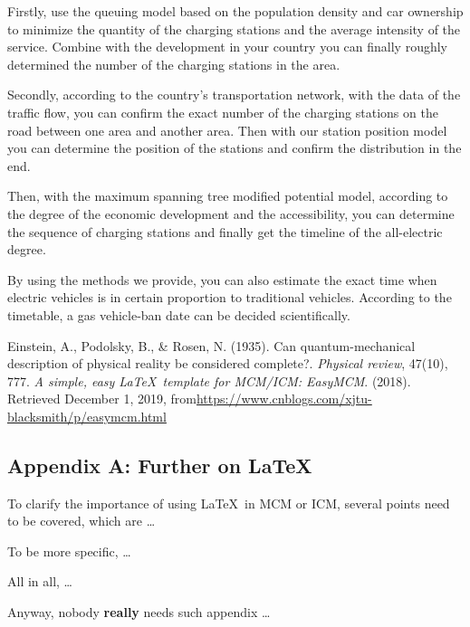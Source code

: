 \documentclass[12pt]{article}  %
\begin{document}
Firstly, use the queuing model based on the population density and car ownership to minimize the quantity of the charging stations and the average intensity of the service. Combine with the development in your country you can finally roughly determined the number of the charging stations in the area.

Secondly, according to the country’s transportation network, with the data of the traffic flow, you can confirm the exact number of the charging stations on the road between one area and another area. Then with our station position model you can determine the position of the stations and confirm the distribution in the end.

Then, with the maximum spanning tree modified potential model, according to the degree of the economic development and the accessibility, you can determine the sequence of charging stations and finally get the timeline of the all-electric degree.

By using the methods we provide, you can also estimate the exact time when electric vehicles is in certain proportion to traditional vehicles. According to the timetable, a gas vehicle-ban date can be decided scientifically.
\begin{thebibliography}{99}
 Einstein, A., Podolsky, B., \& Rosen, N. (1935). Can quantum-mechanical description of physical reality be considered complete?. \emph{Physical review}, 47(10), 777.
 \emph{A simple, easy \LaTeX\ template for MCM/ICM: EasyMCM}. (2018). Retrieved December 1, 2019, from\url{https://www.cnblogs.com/xjtu-blacksmith/p/easymcm.html}
\end{thebibliography}


\begin{subappendices}  %

\section{Appendix A: Further on \LaTeX}
To clarify the importance of using \LaTeX\ in MCM or ICM, several points need to be covered, which are \ldots

To be more specific, \ldots

All in all, \ldots

Anyway, nobody \textbf{really} needs such appendix \ldots

\end{subappendices}
\end{document}
